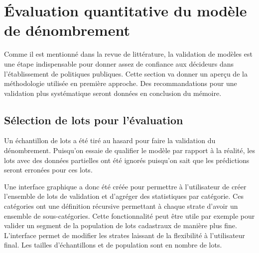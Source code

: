 \section{Évaluation quantitative du modèle de dénombrement}\label{sec:meth_valid}
Comme il est mentionné dans la revue de littérature, la validation de modèles est une étape indispensable pour donner assez de confiance aux décideurs dans l'établissement de politiques publiques. Cette section va donner un aperçu de la méthodologie utilisée en première approche. Des recommandations pour une validation plus systématique seront données en conclusion du mémoire.

    \subsection{Sélection de lots pour l'évaluation}
        Un échantillon de lots a été tiré au hasard pour faire la validation du dénombrement. Puisqu'on essaie de qualifier le modèle par rapport à la réalité, les lots avec des données partielles ont été ignorés puisqu'on sait que les prédictions seront erronées pour ces lots. \par
        Une interface graphique a donc été créée pour permettre à l'utilisateur de créer l'ensemble de lots de validation et d'agréger des statistiques par catégorie. Ces catégories ont une définition récursive permettant à chaque strate d'avoir un ensemble de sous-catégories. Cette fonctionnalité peut être utile par exemple pour valider un segment de la population de lots cadastraux de manière plus fine. L'interface permet de modifier les strates laissant de la flexibilité à l'utilisateur final. Les tailles d'échantillons et de population sont en nombre de lots.

